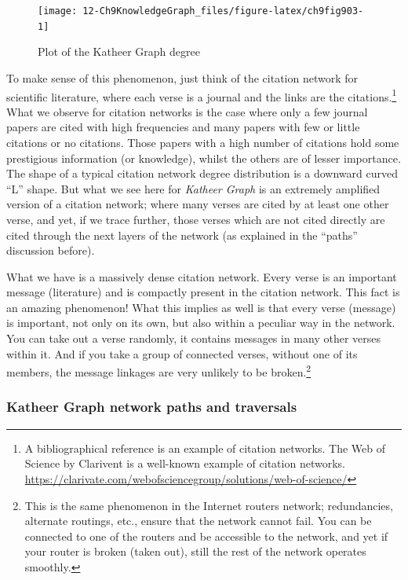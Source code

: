 \documentclass[
]{article}
\begin{document}
\begin{figure}

{\centering \texttt{[image: 12-Ch9KnowledgeGraph\_files/figure-latex/ch9fig903-1]} 

}

\caption{Plot of the Katheer Graph degree}\label{fig:ch9fig903}
\end{figure}

To make sense of this phenomenon, just think of the citation network for scientific literature, where each verse is a journal and the links are the citations.\footnote{A bibliographical reference is an example of citation networks. The Web of Science by Clarivent is a well-known example of citation networks. \url{https://clarivate.com/webofsciencegroup/solutions/web-of-science/}} What we observe for citation networks is the case where only a few journal papers are cited with high frequencies and many papers with few or little citations or no citations. Those papers with a high number of citations hold some prestigious information (or knowledge), whilst the others are of lesser importance. The shape of a typical citation network degree distribution is a downward curved ``L'' shape. But what we see here for \emph{Katheer Graph} is an extremely amplified version of a citation network; where many verses are cited by at least one other verse, and yet, if we trace further, those verses which are not cited directly are cited through the next layers of the network (as explained in the ``paths'' discussion before).

What we have is a massively dense citation network. Every verse is an important message (literature) and is compactly present in the citation network. This fact is an amazing phenomenon! What this implies as well is that every verse (message) is important, not only on its own, but also within a peculiar way in the network. You can take out a verse randomly, it contains messages in many other verses within it. And if you take a group of connected verses, without one of its members, the message linkages are very unlikely to be broken.\footnote{This is the same phenomenon in the Internet routers network; redundancies, alternate routings, etc., ensure that the network cannot fail. You can be connected to one of the routers and be accessible to the network, and yet if your router is broken (taken out), still the rest of the network operates smoothly.}

\hypertarget{katheer-graph-network-paths-and-traversals}{%
\subsubsection{Katheer Graph network paths and traversals}\label{katheer-graph-network-paths-and-traversals}}
\end{document}
